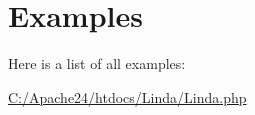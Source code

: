 \section{Examples}
Here is a list of all examples\+:\begin{DoxyCompactItemize}
\item 
\hyperlink{_c_1_2_apache24_2htdocs_2_linda_2_linda_8php-example}{C\+:/\+Apache24/htdocs/\+Linda/\+Linda.\+php}
\end{DoxyCompactItemize}
